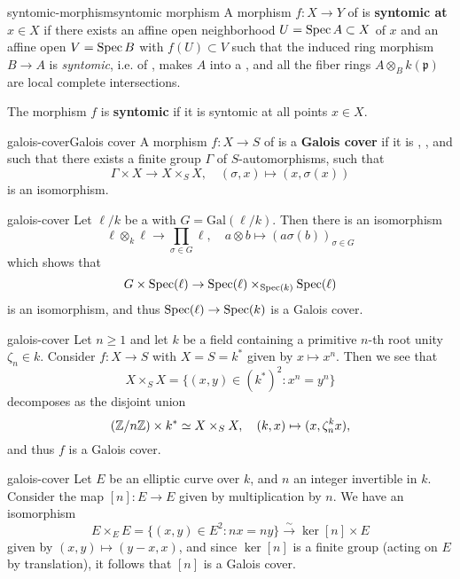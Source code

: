 \begin{topic}{syntomic-morphism}{syntomic morphism}
    A morphism $f : X \to Y$ of  is \textbf{syntomic at $x \in X$} if there exists an affine open neighborhood $U = \operatorname{Spec} A \subset X$ of $x$ and an affine open $V = \operatorname{Spec} B$ with $f(U) \subset V$ such that the induced ring morphism $B \to A$ is \textit{syntomic}, i.e. of , makes $A$ into a  , and all the fiber rings $A \otimes_B k(\mathfrak{p})$ are local complete intersections.
    
    The morphism $f$ is \textbf{syntomic} if it is syntomic at all points $x \in X$.
\end{topic}

\begin{topic}{galois-cover}{Galois cover}
    A morphism $f : X \to S$ of  is a \textbf{Galois cover} if it is , , and such that there exists a finite group $\Gamma$ of $S$-automorphisms, such that
    \[ \Gamma \times X \to X \times_S X, \quad (\sigma, x) \mapsto (x, \sigma(x)) \]
    is an isomorphism.
\end{topic}

\begin{example}{galois-cover}
    Let $\ell / k$ be a  with  $G = \text{Gal}(\ell/k)$. Then there is an isomorphism
    \[ \ell \otimes_k \ell \to \prod_{\sigma \in G} \ell, \quad a \otimes b \mapsto (a \sigma(b))_{\sigma \in G} \]
    which shows that
    \[ G \times \operatorname{Spec}(\ell) \to \operatorname{Spec}(\ell) \times_{\operatorname{Spec}(k)} \operatorname{Spec}(\ell) \]
    is an isomorphism, and thus $\operatorname{Spec}(\ell) \to \operatorname{Spec}(k)$ is a Galois cover.
\end{example}

\begin{example}{galois-cover}
    Let $n \ge 1$ and let $k$ be a field containing a primitive $n$-th root unity $\zeta_n \in k$. Consider $f : X \to S$ with $X = S = k^*$ given by $x \mapsto x^n$. Then we see that
    \[ X \times_S X = \{ (x, y) \in (k^*)^2 : x^n = y^n \} \]
    decomposes as the disjoint union
    \[ (\mathbb{Z}/n\mathbb{Z}) \times k^* \simeq X \times_S X, \quad (k, x) \mapsto (x, \zeta_n^k x) , \]
    and thus $f$ is a Galois cover.
\end{example}

\begin{example}{galois-cover}
    Let $E$ be an elliptic curve over $k$, and $n$ an integer invertible in $k$. Consider the map $[n] : E \to E$ given by multiplication by $n$. We have an isomorphism
    \[ E \times_E E = \{ (x, y) \in E^2 : nx = ny \} \xrightarrow{\sim} \ker [n] \times E \]
    given by $(x, y) \mapsto (y - x, x)$, and since $\ker [n]$ is a finite group (acting on $E$ by translation), it follows that $[n]$ is a Galois cover.
\end{example}

